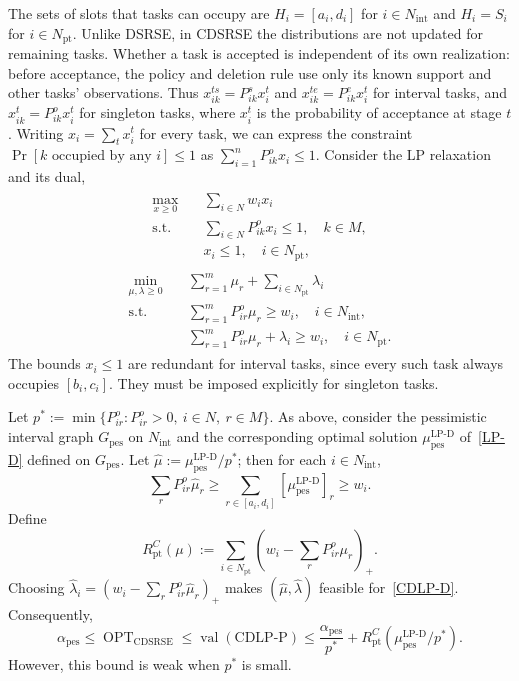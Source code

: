 \documentclass{article}
\DeclareMathOperator{\pes}{pes}
\begin{document}
{The sets of slots that tasks can occupy are $H_i=[a_i,d_i]$ for $i\in N_{\mathrm{int}}$ and $H_i=S_i$ for $i\in N_{\mathrm{pt}}$.}
Unlike DSRSE, in CDSRSE the distributions are not updated for remaining tasks.
{Whether a task is accepted is independent of its own realization: before acceptance, the policy and deletion rule use only its known support and other tasks' observations. Thus $x_{ik}^{ts}=P_{ik}^sx_i^t$ and $x_{ik}^{te}=P_{ik}^ex_i^t$ for interval tasks, and $x_{ik}^t=P_{ik}^ox_i^t$ for singleton tasks, where $x_i^t$ is the probability of acceptance at stage $t$. Writing $x_i=\sum_t x_i^t$ for every task,} we can express the constraint $\Pr[\text{$k$ occupied by any $i$}]\leq1$ as $\sum_{i=1}^nP_{ik}^ox_i\leq1$.
Consider the LP relaxation and its dual,
{
\begin{align}
\label{CDLP-P}\tag{CDLP-P}
\begin{split}
\max_{x\geq0}\quad &\sum_{i\in N}w_ix_i\\
\text{s.t.}\quad &\sum_{i\in N}P_{ik}^ox_i\leq1,\quad k\in M,\\
&x_i\leq1,\quad i\in N_{\mathrm{pt}},
\end{split}
\end{align}
\begin{align}
\label{CDLP-D}\tag{CDLP-D}
\begin{split}
\min_{\mu,\lambda\geq0}\quad &\sum_{r=1}^m\mu_r+\sum_{i\in N_{\mathrm{pt}}}\lambda_i\\
\text{s.t.}\quad &\sum_{r=1}^mP_{ir}^o\mu_r\geq w_i,\quad i\in N_{\mathrm{int}},\\
&\sum_{r=1}^m P_{ir}^o\mu_r+\lambda_i\geq w_i,\quad i\in N_{\mathrm{pt}}.
\end{split}
\end{align}
The bounds $x_i\leq1$ are redundant for interval tasks, since every such task always occupies $[b_i,c_i]$. They must be imposed explicitly for singleton tasks.}

Let $p^*:=\min\{P_{ir}^o:P_{ir}^o>0,\ i\in N,\ r\in M\}$.
As above, consider the pessimistic interval graph $G_{\pes}$ {on $N_{\mathrm{int}}$ }and the corresponding optimal solution $\mu^{\operatorname{LP-D}}_{\pes}$ of~\eqref{LP-D} defined on $G_{\pes}$.
Let $\hat\mu:=\mu^{\operatorname{LP-D}}_{\pes}/p^*$; then for each {$i\in N_{\mathrm{int}}$},
\[
\sum_rP_{ir}^o\hat\mu_r\geq\sum_{r\in[a_i,d_i]}[\mu^{\operatorname{LP-D}}_{\pes}]_r\geq w_i.
\]
{Define
\[
R_{\mathrm{pt}}^C(\mu):=\sum_{i\in N_{\mathrm{pt}}}\left(w_i-\sum_r P_{ir}^o\mu_r\right)_+.
\]
Choosing $\hat{\lambda}_i=(w_i-\sum_r P_{ir}^o\hat\mu_r)_+$ makes $(\hat\mu,\hat\lambda)$ feasible for~\eqref{CDLP-D}. Consequently,
\[
\alpha_{\pes}\leq\operatorname{OPT}_{\operatorname{CDSRSE}}
\leq\operatorname{val}(\mathrm{CDLP\text{-}P})
\leq\frac{\alpha_{\pes}}{p^*}+R_{\mathrm{pt}}^C(\mu^{\operatorname{LP-D}}_{\pes}/p^*).
\]}
However, this bound is weak when $p^*$ is small.
\end{document}
